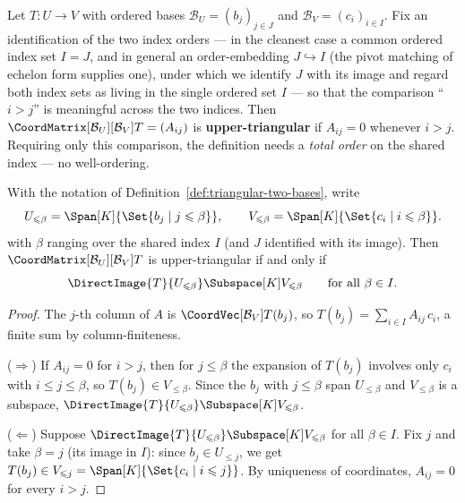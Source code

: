 \begin{definition}
\label{def:triangular-two-bases}
    Let $T: U \to V$ with ordered bases $\mathcal{B}_U = (b_j)_{j \in J}$ and
    $\mathcal{B}_V = (c_i)_{i \in I}$. Fix an identification of the two index orders --- in the
    cleanest case a common ordered index set $I = J$, and in general an order-embedding
    $J \hookrightarrow I$ (the pivot matching of echelon form supplies one), under which we
    identify $J$ with its image and regard both index sets as living in the single ordered set
    $I$ --- so that the comparison ``$i > j$'' is meaningful across the two indices. Then
    $\CoordMatrix[\mathcal{B}_U][\mathcal{B}_V]{T} = (A_{ij})$ is \textbf{upper-triangular} if
    $A_{ij} = 0$ whenever $i > j$. Requiring only this comparison, the definition needs a
    \emph{total order} on the shared index --- no well-ordering.
\end{definition}

\begin{proposition}
\label{prop:triangular-flag}
    With the notation of Definition~\ref{def:triangular-two-bases}, write
    \[
        U_{\leqslant\beta} = \Span[K]{\Set{b_j \mid j \leqslant \beta}}, \qquad
        V_{\leqslant\beta} = \Span[K]{\Set{c_i \mid i \leqslant \beta}}.
    \]
    with $\beta$ ranging over the shared index $I$ (and $J$ identified with its image). Then
    $\CoordMatrix[\mathcal{B}_U][\mathcal{B}_V]{T}$ is upper-triangular if and only if
    \[
        \DirectImage{T}{U_{\leqslant\beta}} \Subspace[K] V_{\leqslant\beta}
        \qquad \text{for all } \beta \in I.
    \]
\end{proposition}

\begin{proof}
    The $j$-th column of $A$ is $\CoordVec[\mathcal{B}_V]{T(b_j)}$, so
    $T(b_j) = \sum_{i \in I} A_{ij}\, c_i$, a finite sum by column-finiteness.

    ($\Rightarrow$) If $A_{ij} = 0$ for $i > j$, then for $j \leqslant \beta$ the expansion of
    $T(b_j)$ involves only $c_i$ with $i \leqslant j \leqslant \beta$, so $T(b_j) \in
    V_{\leqslant\beta}$. Since the $b_j$ with $j \leqslant \beta$ span $U_{\leqslant\beta}$ and
    $V_{\leqslant\beta}$ is a subspace, $\DirectImage{T}{U_{\leqslant\beta}} \Subspace[K]
    V_{\leqslant\beta}$.

    ($\Leftarrow$) Suppose $\DirectImage{T}{U_{\leqslant\beta}} \Subspace[K] V_{\leqslant\beta}$
    for all $\beta \in I$. Fix $j$ and take $\beta = j$ (its image in $I$): since
    $b_j \in U_{\leqslant j}$, we get $T(b_j) \in V_{\leqslant j} = \Span[K]{\Set{c_i \mid i
    \leqslant j}}$. By uniqueness of coordinates, $A_{ij} = 0$ for every $i > j$.
\end{proof}

